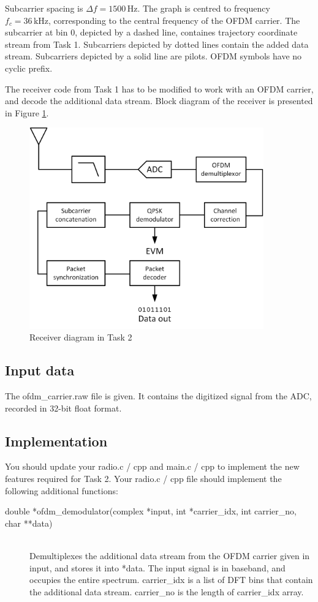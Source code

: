 \documentclass[a4paper]{article}
\begin{document}
Subcarrier spacing is $\varDelta f = 1500 \,\textrm{Hz}$. The graph is centred to frequency $f_c = 36 \,\textrm{kHz}$, corresponding to the central frequency of the OFDM carrier. The subcarrier at bin 0, depicted by a dashed line, containes trajectory coordinate stream from Task 1. Subcarriers depicted by dotted lines contain the added data stream. Subcarriers depicted by a solid line are pilots. OFDM symbols have no cyclic prefix.

The receiver code from Task 1 has to be modified to work with an OFDM carrier, and decode the additional data stream. Block diagram of the receiver is presented in Figure \ref{fig:task2}.

\begin{figure}[h!]
\centering
\includegraphics[width=0.9\textwidth]{Task2.png}
\caption{Receiver diagram in Task 2}
\label{fig:task2}
\end{figure}

\subsection*{Input data}
The \textsf{ofdm\_carrier.raw} file is given. It contains the digitized signal from the ADC, recorded in 32-bit float format.

\subsection*{Implementation}
You should update your radio.c / cpp and main.c / cpp to implement the new features required for Task 2. Your radio.c / cpp file should implement the following additional functions:
\begin{description}
	\item[double *ofdm\_demodulator(complex *input, int *carrier\_idx, int carrier\_no, char **data)]
	\,\\ Demultiplexes the additional data stream from the OFDM carrier given in \textsf{input}, and stores it into \textsf{*data}. The input signal is in baseband, and occupies the entire spectrum. \textsf{carrier\_idx} is a list of DFT bins that contain the additional data stream. \textsf{carrier\_no} is the length of \textsf{carrier\_idx} array.
\end{description}
\end{document}
